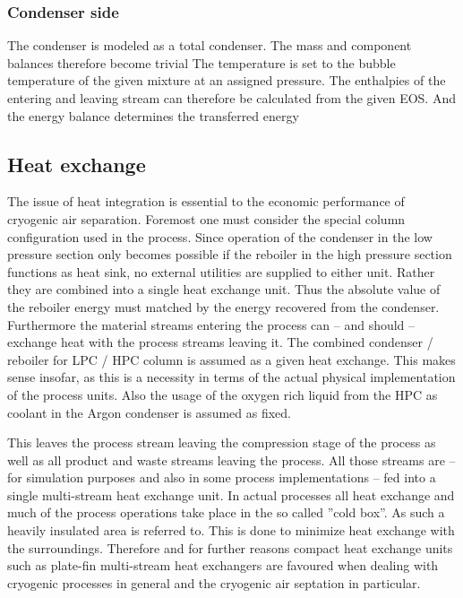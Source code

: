         \subsubsection{Condenser side}
            The condenser is modeled as a total condenser. The mass and component balances therefore become trivial
            The temperature is set to the bubble temperature of the given mixture at an assigned pressure. The
            enthalpies of the entering and leaving stream can therefore be calculated from the given EOS. And
            the energy balance determines the transferred energy

\subsection{Heat exchange}
\label{sec:mathpro:steady:hx}
    The issue of heat integration is essential to the economic performance of cryogenic air separation. Foremost
    one must consider the special column configuration used in the process. Since operation of the condenser in the
    low pressure section only becomes possible if the reboiler in the high pressure section functions as heat sink,
    no external utilities are supplied to either unit. Rather they are combined into a single heat exchange unit. Thus
    the absolute value of the reboiler energy must matched by the energy recovered from the condenser. Furthermore
    the material streams entering the process can -- and should -- exchange heat with the process streams leaving it.
    The combined condenser / reboiler for LPC / HPC column is assumed as a given heat exchange. This makes sense insofar,
    as this is a necessity in terms of the actual physical implementation of the process units. Also the usage of the
    oxygen rich liquid from the HPC as coolant in the Argon condenser is assumed as fixed.

    This leaves the process stream leaving the compression stage of the process as well as all product and waste streams
    leaving the process. All those streams are -- for simulation purposes and also in some process implementations  -- fed
    into a single multi-stream heat exchange unit. In actual processes all heat exchange and much of the process operations
    take place in the so called ''cold box''. As such a heavily insulated area is referred to. This is done to minimize
    heat exchange with the surroundings. Therefore and for further reasons compact heat exchange units such as plate-fin
    multi-stream heat exchangers are favoured when dealing with cryogenic processes in general and the cryogenic air septation
    in particular.

